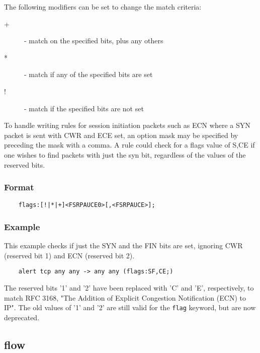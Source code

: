 \documentclass[english]{report}
\newenvironment{note}{
\samepage
    \vspace{10pt}{\textsf{
        {\hspace{7pt}\Huge{$\triangle$\hspace{-12.5pt}{\Large{$^!$}}}}\hspace{5pt}
        {\Large{NOTE}}
    }
    }
   \begin{center}
    \par\vspace{-17pt}

    \begin{lrbox}{\savepar}
    \begin{minipage}[r]{6in}
}
{
    \end{minipage}
    \end{lrbox}
    \fbox{
        \usebox{
            \savepar
	}
    }
    \par\vskip10pt
    \end{center}
}
\newenvironment{note}{
        \begin{rawhtml}
        <p><table border="1"><tr><td><b>
        Note:&nbsp;&nbsp;</b>
        \end{rawhtml}
}{
        \begin{rawhtml}
        </b></td></tr></table></p>
        \end{rawhtml}
}
\begin{document}
The following modifiers can be set to change the match criteria:

\begin{description}
\item [+] - match on the specified bits, plus any others
\item [*] - match if any of the specified bits are set
\item [!] - match if the specified bits are not set
\end{description}

To handle writing rules for session initiation packets such as ECN where a SYN
packet is sent with CWR and ECE set, an option mask
may be specified by preceding the mask with a comma. A rule could check for a flags value of S,CE if one wishes to
find packets with just the syn bit, regardless of the values of the reserved
bits.

\subsubsection{Format}

\begin{verbatim}
    flags:[!|*|+]<FSRPAUCE0>[,<FSRPAUCE>];
\end{verbatim}

\subsubsection{Example}

This example checks if just the SYN and the FIN bits are set, ignoring CWR (reserved
bit 1) and ECN (reserved bit 2).

\begin{verbatim}
    alert tcp any any -> any any (flags:SF,CE;)
\end{verbatim}
	
\begin{note}

The reserved bits '1' and '2' have been replaced with 'C' and 'E', respectively, 
to match RFC 3168, "The Addition of Explicit Congestion Notification (ECN) to IP".
The old values of '1' and '2' are still valid for the \texttt{flag} keyword, but
are now deprecated.

\end{note}
\subsection{flow}
\label{flow section}
\end{document}
